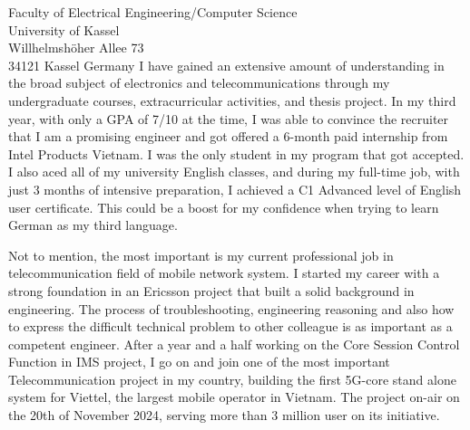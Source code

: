 \documentclass[a4paper,12pt]{letter}
\begin{document}
\begin{letter}{
    Faculty of Electrical Engineering/Computer Science
    \\ University of Kassel
    \\ Willhelmshöher Allee 73
    \\ 34121 Kassel Germany
}
I have gained an extensive amount of understanding in the broad subject of electronics and telecommunications through my undergraduate courses, extracurricular activities, and thesis project. In my third year, with only a GPA of 7/10 at the time, I was able to convince the recruiter that I am a promising engineer and got offered a 6-month paid internship from Intel Products Vietnam. I was the only student in my program that got accepted.
I also aced all of my university English classes, and during my full-time job, with just 3 months of intensive preparation, I achieved a C1 Advanced level of English user certificate. This could be a boost for my confidence when trying to learn German as my third language.

Not to mention, the most important is my current professional job in telecommunication field of mobile network system. I started my career with a strong foundation in an Ericsson project that built a solid background in engineering. The process of troubleshooting, engineering reasoning and also how to express the difficult technical problem to other colleague is as important as a competent engineer. After a year and a half working on the Core Session Control Function in IMS project, I go on and join one of the most important Telecommunication project in my country, building the first 5G-core stand alone system for Viettel, the largest mobile operator in Vietnam. The project on-air on the 20th of November 2024, serving more than 3 million user on its initiative.



\end{letter}
\end{document}

